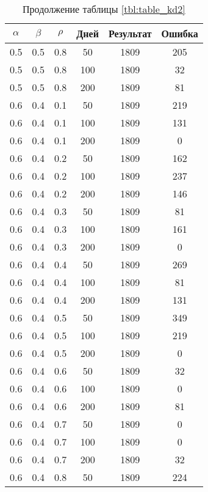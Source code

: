 \begin{table}[h]
	\begin{center}
        \captionsetup{justification=raggedright,singlelinecheck=off}
		\caption*{Продолжение таблицы \ref{tbl:table_kd2}}
		\begin{tabular}{|c|c|c|c|c|c|}
  	\hline
	$\alpha$ & $\beta$ & $\rho$ & Дней & Результат & Ошибка \\\hline
		0.5 &  0.5 &  0.8 &   50 &  1809 &   205 \\
		0.5 &  0.5 &  0.8 &  100 &  1809 &    32 \\
		0.5 &  0.5 &  0.8 &  200 &  1809 &    81 \\
	   \hline
		0.6 &  0.4 &  0.1 &   50 &  1809 &   219 \\
		0.6 &  0.4 &  0.1 &  100 &  1809 &   131 \\
		0.6 &  0.4 &  0.1 &  200 &  1809 &     0 \\
	   \hline
		0.6 &  0.4 &  0.2 &   50 &  1809 &   162 \\
		0.6 &  0.4 &  0.2 &  100 &  1809 &   237 \\
		0.6 &  0.4 &  0.2 &  200 &  1809 &   146 \\
	   \hline
		0.6 &  0.4 &  0.3 &   50 &  1809 &    81 \\
		0.6 &  0.4 &  0.3 &  100 &  1809 &   161 \\
		0.6 &  0.4 &  0.3 &  200 &  1809 &     0 \\
	   \hline
		0.6 &  0.4 &  0.4 &   50 &  1809 &   269 \\
		0.6 &  0.4 &  0.4 &  100 &  1809 &    81 \\
		0.6 &  0.4 &  0.4 &  200 &  1809 &   131 \\
	   \hline
		0.6 &  0.4 &  0.5 &   50 &  1809 &   349 \\
		0.6 &  0.4 &  0.5 &  100 &  1809 &   219 \\
		0.6 &  0.4 &  0.5 &  200 &  1809 &     0 \\
	   \hline
		0.6 &  0.4 &  0.6 &   50 &  1809 &    32 \\
		0.6 &  0.4 &  0.6 &  100 &  1809 &     0 \\
		0.6 &  0.4 &  0.6 &  200 &  1809 &    81 \\
	   \hline
		0.6 &  0.4 &  0.7 &   50 &  1809 &     0 \\
		0.6 &  0.4 &  0.7 &  100 &  1809 &     0 \\
		0.6 &  0.4 &  0.7 &  200 &  1809 &    32 \\
	   \hline
		0.6 &  0.4 &  0.8 &   50 &  1809 &   224 \\

\end{tabular}
\end{center}
\end{table}
